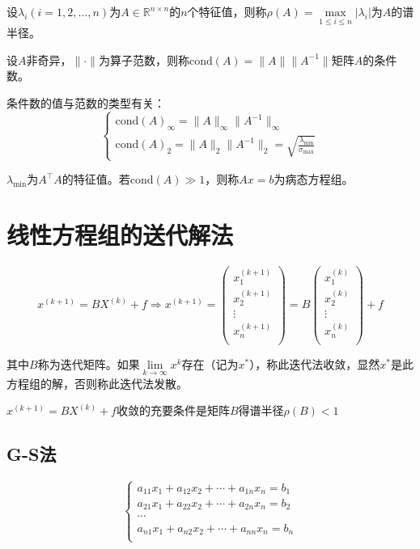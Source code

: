 \documentclass[UTF8,a4paper,11pt,oneside]{ctexbook}
\begin{document}
设\(\lambda_i(i=1,2,\ldots,n)\)为\(A\in\mathbb{R}^{n\times n}\)的\(n\)个特征值，则称\(\rho(A)=\max\limits_{1\leq i\leq n}|\lambda_i|\)为\(A\)的谱半径。

设\(A\)非奇异，\(\|\cdot\|\)为算子范数，则称\(\mathrm{cond}(A)=\|A\|\|A^{-1}\|\)矩阵\(A\)的条件数。

条件数的值与范数的类型有关：
\[
\begin{cases}
    \mathrm{cond}(A)_\infty=\|A\|_\infty\|A^{-1}\|_\infty\\
    \mathrm{cond}(A)_2=\|A\|_2\|A^{-1}\|_2=\sqrt{\frac{\lambda_{\min}}{{\sigma_{\max}}}}
\end{cases}
\]

\(\lambda_{\min}\)为\(A^\top A\)的特征值。若\(\mathrm{cond}(A)\gg1\)，则称\(Ax=b\)为病态方程组。
 
\section{线性方程组的送代解法}
\[
x^{(k+1)}=BX^{(k)}+f\Rightarrow x^{(k+1)}=\begin{pmatrix}
    x_1^{(k+1)}\\
    x_2^{(k+1)}\\
    \vdots\\
    x_n^{(k+1)}\\
\end{pmatrix}
=B\begin{pmatrix}
    x_1^{(k)}\\
    x_2^{(k)}\\
    \vdots\\
    x_n^{(k)}\\
\end{pmatrix}
+f
\]

其中\(B\)称为迭代矩阵。如果\(\lim\limits_{k\to\infty}x^k\)存在（记为\(x^*\)），称此迭代法收敛，显然\(x^*\)是此方程组的解，否则称此迭代法发散。

\(x^{(k+1)}=BX^{(k)}+f\)收敛的充要条件是矩阵\(B\)得谱半径\(\rho(B)<1\)

\subsection{G-S法}
\[
\begin{cases}
    a_{11}x_1+a_{12}x_2+\cdots+a_{1n}x_n=b_1\\
    a_{21}x_1+a_{22}x_2+\cdots+a_{2n}x_n=b_2\\
    \cdots\\
    a_{n1}x_1+a_{n2}x_2+\cdots+a_{nn}x_n=b_n\\
\end{cases}
\]
\end{document}
